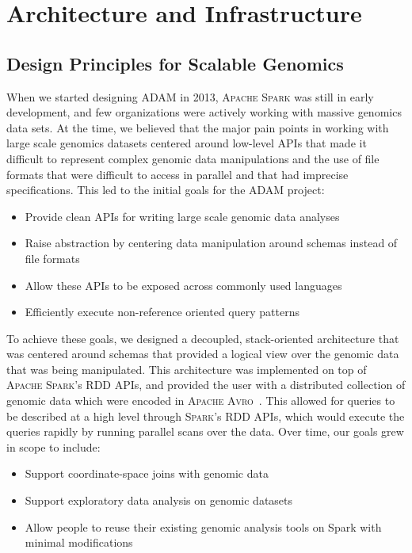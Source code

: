 \documentclass[phd]{ucbthesis}
\begin{document}
\part{Architecture and Infrastructure}

\chapter{Design Principles for Scalable Genomics}
\label{chap:design}

When we started designing \textsc{ADAM} in 2013, \textsc{Apache Spark} was still
in early development, and few organizations were actively working with massive
genomics data sets. At the time, we believed that the major pain points in
working with large scale genomics datasets centered around low-level APIs that
made it difficult to represent complex genomic data manipulations and the use of
file formats that were difficult to access in parallel and that had imprecise
specifications. This led to the initial goals for the \textsc{ADAM} project:

\begin{itemize}
\item Provide clean APIs for writing large scale genomic data analyses
\item Raise abstraction by centering data manipulation around schemas instead
  of file formats
\item Allow these APIs to be exposed across commonly used languages
\item Efficiently execute non-reference oriented query patterns
\end{itemize}

To achieve these goals, we designed a decoupled, stack-oriented architecture
that was centered around schemas that provided a logical view over the genomic
data that was being manipulated. This architecture was implemented on top of
\textsc{Apache Spark}'s RDD APIs, and provided the user with a distributed
collection of genomic data which were encoded in \textsc{Apache
  Avro}~\cite{avro}. This allowed for queries to be described at a high level
through \textsc{Spark}'s RDD APIs, which would execute the queries rapidly by
running parallel scans over the data. Over time, our goals grew in scope to
include:

\begin{itemize}
\item Support coordinate-space joins with genomic data
\item Support exploratory data analysis on genomic datasets
\item Allow people to reuse their existing genomic analysis tools on Spark with
  minimal modifications
\end{itemize}
\end{document}
